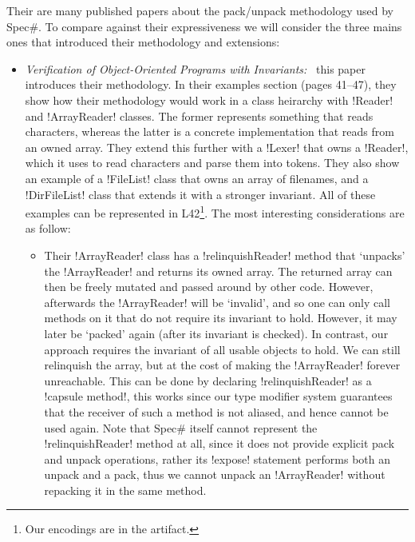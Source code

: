 Their are many published papers about the pack/unpack methodology used by Spec\#. To compare against their expressiveness we will consider the three mains ones that introduced their methodology and extensions:
\begin{itemize}
	\item \emph{Verification of Object-Oriented Programs with Invariants:}~\cite{DBLP:journals/jot/BarnettDFLS04} this paper introduces their methodology. In their examples section (pages 41--47), they show how their methodology would work in a class heirarchy with \Q!Reader! and \Q!ArrayReader! classes. The former represents something that reads characters, whereas the latter is a concrete implementation that reads from an owned array. They extend this further with a \Q!Lexer! that owns a \Q!Reader!, which it uses to read characters and parse them into tokens. They also show an example of a \Q!FileList! class that owns an array of filenames, and a \Q!DirFileList! class that extends it with a stronger invariant. All of these examples can be represented in L42\footnote{Our encodings are in the artifact.}. The most interesting considerations are as follow:
	\begin{itemize}
		\item Their \Q!ArrayReader! class has a \Q!relinquishReader! method that `unpacks' the \Q!ArrayReader! and returns its owned array.
The returned array can then be freely mutated and passed around by other code.
However, afterwards the \Q!ArrayReader! will be `invalid', and so one can only call methods on it that do not require its invariant to hold. However, it may later be `packed' again (after its invariant is checked).
In contrast, our approach requires the invariant of all usable objects to hold.
We can still relinquish the array, but at the cost of making the \Q!ArrayReader! forever unreachable. This can be done by
 declaring \Q!relinquishReader! as a \Q!capsule method!, this works since our type modifier system guarantees that the receiver of such a method is not aliased, and hence cannot be used again. Note that Spec\# itself cannot represent the \Q!relinquishReader! method at all, since it does not provide explicit pack and unpack operations, rather its \Q!expose! statement performs both an unpack and a pack, thus we cannot unpack an \Q!ArrayReader! without repacking it in the same method.

\end{itemize}
\end{itemize}
